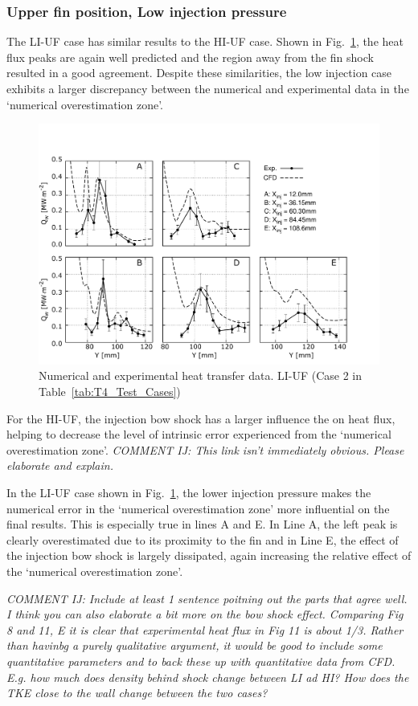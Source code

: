 \documentclass{AIAA}
\begin{document}
\subsubsection{Upper fin position, Low injection pressure}

The LI-UF case has similar results to the HI-UF case. 
Shown in Fig.~\ref{fig:HeatFluxLPLIUF}, the heat flux peaks are again well predicted and the region away from the fin shock resulted in a good agreement.
Despite these similarities, the low injection case exhibits a larger discrepancy between the numerical and experimental data in the `numerical overestimation zone'. 


\begin{figure}[!h]
\center
\includegraphics[trim = 0mm 3mm 25mm 25mm, clip, width=0.60\columnwidth,valign=t,fbox]{Figures/Data/LP_LI_UF/GNUP_CFD_GaugesLines_Multi.pdf}
\caption{Numerical and experimental heat transfer data. LI-UF (Case 2 in Table~\ref{tab:T4_Test_Cases})}
\label{fig:HeatFluxLPLIUF}
\end{figure} 
%


For the HI-UF, the injection bow shock has a larger influence the on heat flux, helping to decrease the level of intrinsic error experienced from the `numerical overestimation zone'.
{\it COMMENT IJ: This link isn't immediately obvious. Please elaborate and explain.}

In the LI-UF case shown in Fig.~\ref{fig:HeatFluxLPLIUF}, the lower injection pressure makes the numerical error in the `numerical overestimation zone' more influential on the final results.
This is especially true in lines A and E.
In Line A, the left peak is clearly overestimated due to its proximity to the fin and in Line E, the effect of the injection bow shock is largely dissipated, again increasing the relative effect of the `numerical overestimation zone'.

{\it COMMENT IJ: Include at least 1 sentence poitning out the parts  that agree well. I think you can also elaborate a bit more on the bow shock effect. Comparing Fig 8 and 11, E it is clear that experimental heat flux in Fig 11 is about 1/3. Rather than havinbg a purely qualitative argument, it would be good to include some quantitative parameters and to back these up with quantitative data from CFD. E.g. how much does density behind shock change between LI ad HI? How does the TKE close to the wall change between the two cases?}
\end{document}
